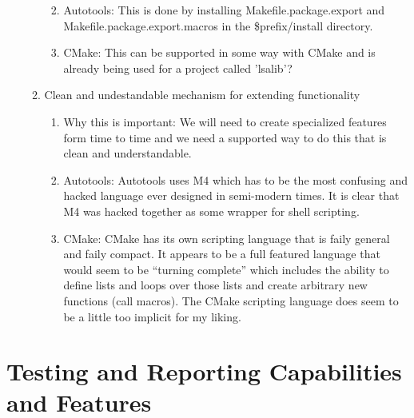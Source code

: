 \documentclass[pdf,ps2pdf,11pt]{SANDreport}
\begin{document}
\begin{enumerate}
\begin{enumerate}
\begin{enumerate}
    {}\item Autotools: This is done by installing
    Makefile.package.export and Makefile.package.export.macros in the
    \$prefix/install directory.

    {}\item CMake: This can be supported in some way with CMake and is
    already being used for a project called 'lsalib'?

    \end{enumerate}

  {}\item Clean and undestandable mechanism for extending
  functionality

    \begin{enumerate}

    {}\item Why this is important: We will need to create specialized
    features form time to time and we need a supported way to do this
    that is clean and understandable.

    {}\item Autotools: Autotools uses M4 which has to be the most
    confusing and hacked language ever designed in semi-modern times.
    It is clear that M4 was hacked together as some wrapper for shell
    scripting.

    {}\item CMake: CMake has its own scripting language that is faily
    general and faily compact.  It appears to be a full featured
    language that would seem to be ``turning complete'' which includes
    the ability to define lists and loops over those lists and create
    arbitrary new functions (call macros).  The CMake scripting
    language does seem to be a little too implicit for my liking.

    \end{enumerate}

  \end{enumerate}

\end{enumerate}


%
\section{Testing and Reporting Capabilities and Features}
%
\end{document}
